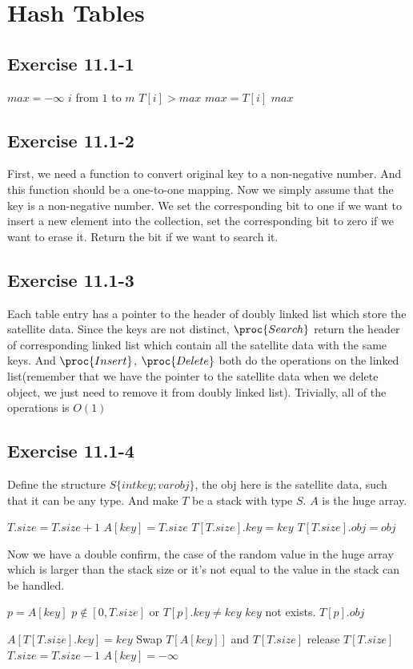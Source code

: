 \documentclass[12pt]{article}
\theoremstyle{definition}
\theoremstyle{remark}
\begin{document}
\section{Hash Tables}
\subsection*{Exercise 11.1-1}
\begin{codebox}
\li $max=-\infty$
\li \For $i$ from $1$ to $m$
\li \quad \If $T[i]>max$
\li \qquad $max=T[i]$
\li \Return $max$
\end{codebox}
\subsection*{Exercise 11.1-2}
First, we need a function to convert original key to a non-negative number. And this function should be a one-to-one mapping. Now we simply assume that the key is a non-negative number. We set the corresponding bit to one if we want to insert a new element into the collection, set the corresponding bit to zero if we want to erase it. Return the bit if we want to search it.
\subsection*{Exercise 11.1-3}
Each table entry has a pointer to the header of doubly linked list which store the satellite data. Since the keys are not distinct, $\proc{Search}$ return the header of corresponding linked list which contain all the satellite data with the same keys. And $\proc{Insert}$, $\proc{Delete}$ both do the operations on the linked list(remember that we have the pointer to the satellite data when we delete object, we just need to remove it from doubly linked list). Trivially, all of the operations is $O(1)$
\subsection*{Exercise 11.1-4}
Define the structure $S\{int key; var obj\}$, the obj here is the satellite data, such that it can be any type. And make $T$ be a stack with type $S$. $A$ is the huge array.
\begin{codebox}
\li $T.size=T.size+1$
\li $A[key]=T.size$
\li $T[T.size].key=key$
\li $T[T.size].obj=obj$
\end{codebox}
Now we have a double confirm, the case of the random value in the huge array which is larger than the stack size or it's not equal to the value in the stack can be handled.
\begin{codebox}
\li $p=A[key]$
\li \If $p\not\in[0,T.size]$ or $T[p].key\not=key$
\li \quad \Return $key$ not exists.
\li \Return $T[p].obj$
\end{codebox}
\begin{codebox}
\li $A[T[T.size].key]=key$
\li Swap $T[A[key]]$ and $T[T.size]$
\li release $T[T.size]$
\li $T.size=T.size-1$
\li $A[key]=-\infty$
\end{codebox}
\end{document}
